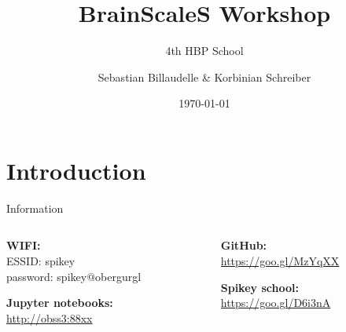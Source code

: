 \documentclass[aspectratio=169]{beamer}
\title{BrainScaleS Workshop}
\subtitle{4th HBP School}
\date{\today}
\author{Sebastian Billaudelle \& Korbinian Schreiber}
\institute{Kirchhoff-Institute for Physics, Heidelberg University}
\begin{document}
\maketitle

\section{Introduction}

\begin{frame}{Information}
	\begin{columns}[onlytextwidth]
		\begin{column}{0.45\textwidth}
			\textbf{WIFI:} \\
			ESSID: spikey \\
			password: spikey@obergurgl

			\vspace{3ex}

			\textbf{Jupyter notebooks:} \\
			\url{http://obss3:88xx}
		\end{column}
		\hfill
		\begin{column}{0.45\textwidth}
			\textbf{GitHub:} \\
			\url{https://goo.gl/MzYqXX}

			\vspace{3ex}

			\textbf{Spikey school:} \\
			\url{https://goo.gl/D6i3nA}
		\end{column}
	\end{columns}
\end{frame}
\end{document}
